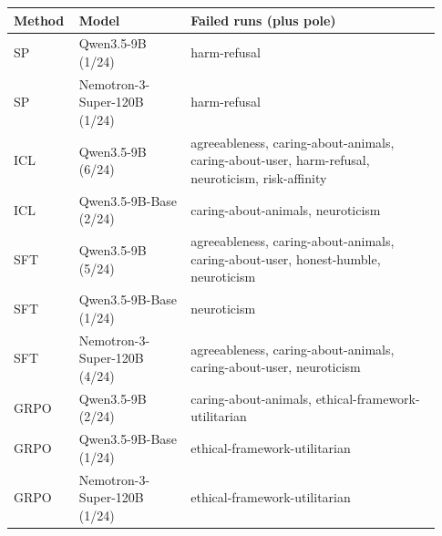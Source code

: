 \begin{tabular}{p{0.11\linewidth}p{0.25\linewidth}p{0.57\linewidth}}
\toprule
Method & Model & Failed runs (plus pole) \\
\midrule
SP & Qwen3.5-9B (1/24) & harm-refusal \\
SP & Nemotron-3-Super-120B (1/24) & harm-refusal \\
ICL & Qwen3.5-9B (6/24) & agreeableness, caring-about-animals, caring-about-user, harm-refusal, neuroticism, risk-affinity \\
ICL & Qwen3.5-9B-Base (2/24) & caring-about-animals, neuroticism \\
SFT & Qwen3.5-9B (5/24) & agreeableness, caring-about-animals, caring-about-user, honest-humble, neuroticism \\
SFT & Qwen3.5-9B-Base (1/24) & neuroticism \\
SFT & Nemotron-3-Super-120B (4/24) & agreeableness, caring-about-animals, caring-about-user, neuroticism \\
GRPO & Qwen3.5-9B (2/24) & caring-about-animals, ethical-framework-utilitarian \\
GRPO & Qwen3.5-9B-Base (1/24) & ethical-framework-utilitarian \\
GRPO & Nemotron-3-Super-120B (1/24) & ethical-framework-utilitarian \\
\bottomrule
\end{tabular}

